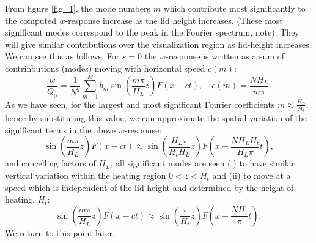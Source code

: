 \documentclass[12pt]{article}
\begin{document}
From figure \ref{fig_1}, the mode numbers $m$ which contribute most significantly to the computed $w$-response increase as the lid height increases. 
(These most significant modes correspond to the peak in the Fourier spectrum, note). They will give similar contributions over the visualization region as lid-height increases.
We can see this as follows.  For $s=0$ the $w$-response is written as a sum of contrinbutions (modes) moving with horizontal speed $c(m)$:
%
\begin{equation}
\label{equ_response}
\frac{w}{Q_0} = \frac{1}{N^2} \sum_{m-1}^M b_m \sin \left( \frac{m \pi}{H_L} z\right) F(x - c t), \quad c(m) = \frac{N H_L}{ m \pi}.
\end{equation}
%
As we have seen, for the largest and most significant Fourier coefficients $m \approx \frac{H_L}{H_t}$, hence by substituting this value, 
we can approximate the spatial variation of the significant terms in the above $w$-response:
%
\begin{equation}
\sin \left( \frac{m \pi}{H_L} z\right) F(x - c t) \approx \sin \left( \frac{H_L \pi}{H_t H_L} z\right) F \left( x - \frac{N H_L H_t}{ H_L \pi} t \right),
\end{equation}
%
and cancelling factors of $H_L$, all significant modes are seen (i) to have similar vertical variation within the heating region $0<z<H_t$ and (ii) to
move at a speed which is independent of the lid-height and determined by the height of heating, $H_t$: 
%
\begin{equation}
\sin \left( \frac{m \pi}{H_L} z\right) F(x - c t) \approx \sin \left( \frac{\pi}{H_t} z\right) F \left( x - \frac{N H_t}{ \pi} t \right),
\end{equation}
%
We return to this point later.
\end{document}
